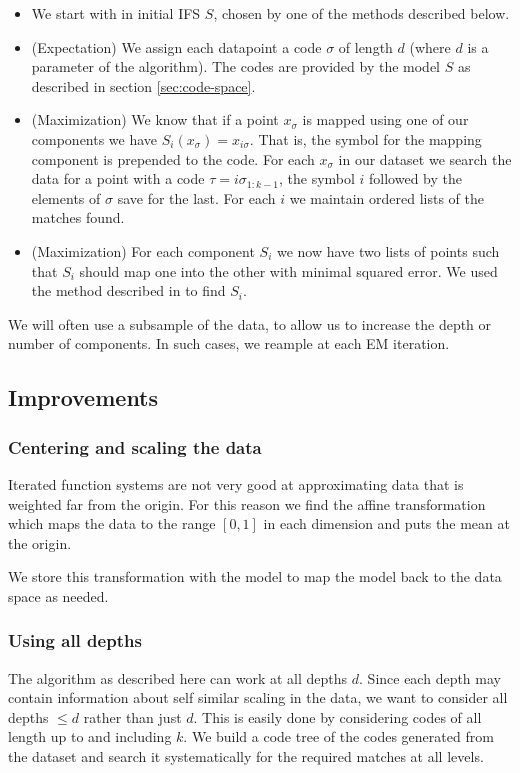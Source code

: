 \documentclass[10pt,a4paper,oneside]{article}
\theoremstyle{definition}
\begin{document}
\begin{itemize}
\item We start with in initial IFS $S$, chosen by one of the methods described below. 
\item (Expectation) We assign each datapoint a code $\sigma$ of length $d$ (where $d$ is a parameter of the algorithm). The codes are provided by the model $S$ as described in section \ref{sec:code-space}. 
\item (Maximization) We know that if a point $x_\sigma$ is mapped using one of our components we have $S_i(x_\sigma) = x_{i\sigma}$. That is, the symbol for the mapping component is prepended to the code. For each $x_\sigma$ in our dataset we search the data for a point with a code $\tau = i\sigma_{1:k-1}$, the symbol $i$ followed by the elements of $\sigma$ save for the last. For each $i$ we maintain ordered lists of the matches found.
\item (Maximization) For each component $S_i$ we now have two lists of points such that $S_i$ should map one into the other with minimal squared error. We used the method described in \cite{umeyama1991least} to find $S_i$. 
\end{itemize}

We will often use a subsample of the data, to allow us to increase the depth or number of components. In such cases, we reample at each EM iteration.
 
\subsection*{Improvements}

\subsubsection*{Centering and scaling the data}

Iterated function systems are not very good at approximating data that is weighted far from the origin. For this reason we find the affine transformation which maps the data to the range $[0,1]$ in each dimension and puts the mean at the origin.

We store this transformation with the model to map the model back to the data space as needed.

\subsubsection*{Using all depths}

The algorithm as described here can work at all depths $d$. Since each depth may contain information about self similar scaling in the data, we want to consider all depths $\leq d$ rather than just $d$. This is easily done by considering codes of all length up to and including $k$. We build a code tree of the codes generated from the dataset and search it systematically for the required matches at all levels.
\end{document}
